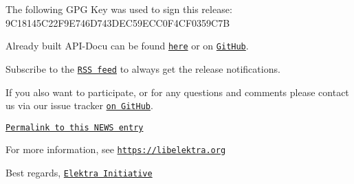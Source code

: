 The following G\+PG Key was used to sign this release\+: 9\+C18145\+C22\+F9\+E746\+D743\+D\+E\+C59\+E\+C\+C0\+F4\+C\+F0359\+C7B

Already built A\+P\+I-\/\+Docu can be found \href{https://doc.libelektra.org/api/0.9.3/html/}{\tt here} or on \href{https://github.com/ElektraInitiative/doc/tree/master/api/0.9.3}{\tt Git\+Hub}.

Subscribe to the \href{https://www.libelektra.org/news/feed.rss}{\tt R\+SS feed} to always get the release notifications.

If you also want to participate, or for any questions and comments please contact us via our issue tracker \href{http://issues.libelektra.org}{\tt on Git\+Hub}.

\href{https://www.libelektra.org/news/0.9.3-release}{\tt Permalink to this N\+E\+WS entry}

For more information, see \href{https://libelektra.org}{\tt https\+://libelektra.\+org}

Best regards, \href{https://www.libelektra.org/developers/authors}{\tt Elektra Initiative} 